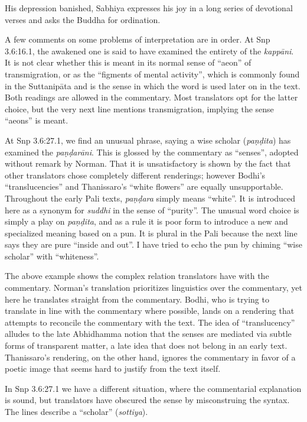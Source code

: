 \documentclass[12pt,openany]{book}%
\begin{document}
His depression banished, Sabhiya expresses his joy in a long series of devotional verses and asks the Buddha for ordination.

A few comments on some problems of interpretation are in order. At Snp 3.6:16.1, the awakened one is said to have examined the entirety of the \textit{\textsanskrit{kappāni}}. It is not clear whether this is meant in its normal sense of “aeon” of transmigration, or as the “figments of mental activity”, which is commonly found in the \textsanskrit{Suttanipāta} and is the sense in which the word is used later on in the text. Both readings are allowed in the commentary. Most translators opt for the latter choice, but the very next line mentions transmigration, implying the sense “aeons” is meant.

At Snp 3.6:27.1, we find an unusual phrase, saying a wise scholar (\textit{\textsanskrit{paṇḍita}}) has examined the \textit{\textsanskrit{paṇḍarāni}}. This is glossed by the commentary as “senses”, adopted without remark by Norman. That it is unsatisfactory is shown by the fact that other translators chose completely different renderings; however Bodhi’s “translucencies” and Thanissaro’s “white flowers” are equally unsupportable. Throughout the early Pali texts, \textit{\textsanskrit{paṇḍara}} simply means “white”. It is introduced here as a synonym for \textit{suddhi} in the sense of “purity”. The unusual word choice is simply a play on \textit{\textsanskrit{paṇḍita}}, and as a rule it is poor form to introduce a new and specialized meaning based on a pun. It is plural in the Pali because the next line says they are pure “inside and out”. I have tried to echo the pun by chiming “wise scholar” with “whiteness”. 

The above example shows the complex relation translators have with the commentary. Norman’s translation prioritizes linguistics over the commentary, yet here he translates straight from the commentary. Bodhi, who is trying to translate in line with the commentary where possible, lands on a rendering that attempts to reconcile the commentary with the text. The idea of “translucency” alludes to the late Abhidhamma notion that the senses are mediated via subtle forms of transparent matter, a late idea that does not belong in an early text. Thanissaro’s rendering, on the other hand, ignores the commentary in favor of a poetic image that seems hard to justify from the text itself.

In Snp 3.6:27.1 we have a different situation, where the commentarial explanation is sound, but translators have obscured the sense by misconstruing the syntax. The lines describe a “scholar” (\textit{sottiya}). 
\end{document}

